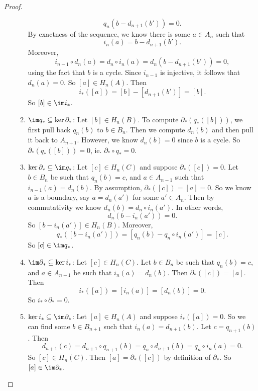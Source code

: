 \documentclass[a4paper]{article}
\theoremstyle{definition}
\begin{document}
\begin{proof}
\begin{enumerate}
\begin{enumerate}
          \[
            q_n (b - d_{n + 1}(b')) = 0.
          \]
          By exactness of the sequence, we know there is some $a \in A_n$ such that
          \[
            i_n(a) = b - d_{n + 1}(b').
          \]
          Moreover,
          \[
            i_{n - 1} \circ d_n(a) = d_n \circ i_n (a) = d_n(b - d_{n + 1}(b')) = 0,
          \]
          using the fact that $b$ is a cycle. Since $i_{n - 1}$ is injective, it follows that $d_n(a) = 0$. So $[a] \in H_n(A)$. Then
          \[
            i_*([a]) = [b] - [d_{n + 1}(b')] = [b].
          \]
          So $[b] \in \im i_*$.
        \item $\im q_* \subseteq \ker \partial_*$: Let $[b] \in H_n(B)$. To compute $\partial_*(q_*([b]))$, we first pull back $q_n(b)$ to $b \in B_n$. Then we compute $d_n(b)$ and then pull it back to $A_{n + 1}$. However, we know $d_n(b) = 0$ since $b$ is a cycle. So $\partial_*(q_*([b])) = 0$, ie. $\partial_* \circ q_* = 0$.
        \item $\ker \partial_* \subseteq \im q_*$: Let $[c] \in H_n(C)$ and suppose $\partial_*([c]) = 0$. Let $b \in B_n$ be such that $q_n(b) = c$, and $a \in A_{n - 1}$ such that $i_{n - 1}(a) = d_n(b)$. By assumption, $\partial_*([c]) = [a] = 0$. So we know $a$ is a boundary, say $a = d_n (a')$ for some $a' \in A_n$. Then by commutativity we know $d_n(b) = d_n \circ i_n (a')$. In other words,
          \[
            d_n(b - i_n(a')) = 0.
          \]
          So $[b - i_n(a')] \in H_n(B)$. Moreover,
          \[
            q_*([b - i_n(a')]) = [q_n(b) - q_n \circ i_n(a')] = [c].
          \]
          So $[c] \in \im q_*$.
        \item $\im \partial_* \subseteq \ker i_*$: Let $[c] \in H_n(C)$. Let $b \in B_n$ be such that $q_n(b) = c$, and $a \in A_{n - 1}$ be such that $i_n(a) = d_n(b)$. Then $\partial_*([c]) = [a]$. Then
          \[
            i_*([a]) = [i_n(a)] = [d_n(b)] = 0.
          \]
          So $i_* \circ \partial_* = 0$.
        \item $\ker i_* \subseteq \im \partial_*$: Let $[a] \in H_n(A)$ and suppose $i_*([a]) = 0$. So we can find some $b \in B_{n + 1}$ such that $i_n(a) = d_{n + 1}(b)$. Let $c = q_{n + 1}(b)$. Then
          \[
            d_{n + 1}(c) = d_{n + 1}\circ q_{n + 1} (b) = q_n \circ d_{n + 1}(b) = q_n \circ i_n (a) = 0.
          \]
          So $[c] \in H_n(C)$. Then $[a] = \partial_*([c])$ by definition of $\partial_*$. So $[a] \in \im \partial_*$.
      \end{enumerate}
  \end{enumerate}
\end{proof}
\end{document}
